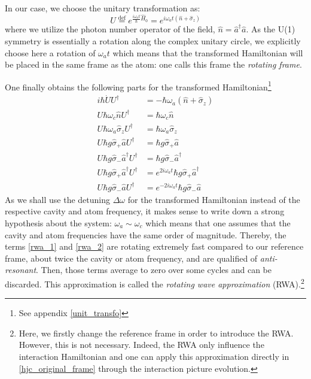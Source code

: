 \documentclass[11pt]{report}
\begin{document}
In our case, we choose the unitary transformation as:
\begin{equation}
\label{unitary_trans_def}
U \stackrel{\text{def}}{=} e^{\frac{i\omega_at}{\hbar}\hat{H}_0} = e^{i\omega_at(\hat{n} + \hat{\sigma}_z)}
\end{equation}
where we utilize the photon number operator of the field, $\hat{n} = \hat{a}^{\dag}\hat{a}$. As the U(1) symmetry is essentially a rotation along the complex unitary circle, we explicitly choose here a rotation of $\omega_at$ which means that the transformed Hamiltonian will be placed in the same frame as the atom: one calls this frame the \textit{rotating frame}.

One finally obtains the following parts for the transformed Hamiltonian\footnote{See appendix \ref{unit_transfo}}
\begin{align}
i\hbar \dot{U} U^{\dag} &= -\hbar\omega_a(\hat{n} + \hat{\sigma}_z)\\
U\hbar \omega_c\hat{n} U^{\dag} &= \hbar\omega_c\hat{n}\\
U\hbar \omega_a\hat{\sigma}_z U^{\dag} &= \hbar\omega_a\hat{\sigma}_z\\
U\hbar g\hat{\sigma}_+\hat{a} U^{\dag} &= \hbar g\hat{\sigma}_+\hat{a}\\
U\hbar g\hat{\sigma}_-\hat{a}^{\dag} U^{\dag} &= \hbar g\hat{\sigma}_-\hat{a}^{\dag}\\
\label{rwa_1}
U\hbar g\hat{\sigma}_+\hat{a}^{\dag} U^{\dag} &= e^{2i\omega_at}\hbar g\hat{\sigma}_+\hat{a}^{\dag}\\
\label{rwa_2}
U\hbar g\hat{\sigma}_-\hat{a} U^{\dag} &= e^{-2i\omega_at}\hbar g\hat{\sigma}_-\hat{a}
\end{align}
As we shall use the detuning $\Delta\omega$ for the transformed Hamiltonian instead of the respective cavity and atom frequency, it makes sense to write down a strong hypothesis about the system: $\omega_a \sim \omega_c$ which means that one assumes that the cavity and atom frequencies have the same order of magnitude. Thereby, the terms \eqref{rwa_1} and \eqref{rwa_2} are rotating extremely fast compared to our reference frame, about twice the cavity or atom frequency, and are qualified of \textit{anti-resonant}. Then, those terms average to zero over some cycles and can be discarded. This approximation is called the \textit{rotating wave approximation} (RWA).\footnote{Here, we firstly change the reference frame in order to introduce the RWA. However, this is not necessary. Indeed, the RWA only influence the interaction Hamiltonian and one can apply this approximation directly in \eqref{hjc_original_frame} through the interaction picture evolution.}
\end{document}
